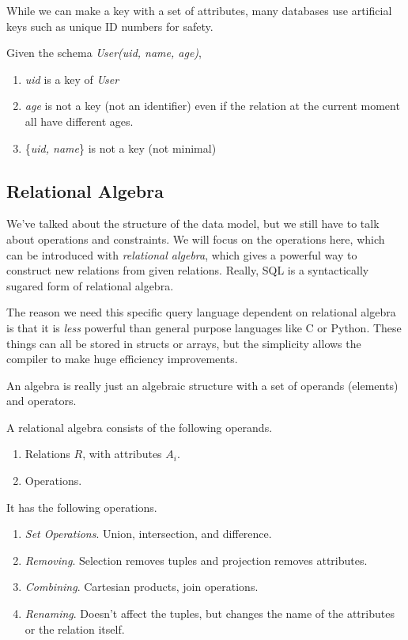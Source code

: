 \documentclass{article}
\begin{document}
    While we can make a key with a set of attributes, many databases use artificial keys such as unique ID numbers for safety. 

    \begin{example}
      Given the schema \textit{User(uid, name, age)}, 
      \begin{enumerate}
        \item \textit{uid} is a key of \textit{User} 
        \item \textit{age} is not a key (not an identifier) even if the relation at the current moment all have different ages. 
        \item \{\textit{uid, name}\} is not a key (not minimal)
      \end{enumerate}
    \end{example}

  \subsection{Relational Algebra}

    We've talked about the structure of the data model, but we still have to talk about operations and constraints. We will focus on the operations here, which can be introduced with \textit{relational algebra}, which gives a powerful way to construct new relations from given relations. Really, SQL is a syntactically sugared form of relational algebra. 

    The reason we need this specific query language dependent on relational algebra is that it is \textit{less} powerful than general purpose languages like C or Python. These things can all be stored in structs or arrays, but the simplicity allows the compiler to make huge efficiency improvements. 

    An algebra is really just an algebraic structure with a set of operands (elements) and operators.  

    \begin{definition}
      A relational algebra consists of the following operands. 
      \begin{enumerate}
        \item Relations $R$, with attributes $A_i$. 
        \item Operations. 
      \end{enumerate}
      It has the following operations. 
      \begin{enumerate}
        \item \textit{Set Operations}. Union, intersection, and difference. 
        \item \textit{Removing}. Selection removes tuples and projection removes attributes. 
        \item \textit{Combining}. Cartesian products, join operations. 
        \item \textit{Renaming}. Doesn't affect the tuples, but changes the name of the attributes or the relation itself. 
      \end{enumerate}
    \end{definition}
\end{document}
